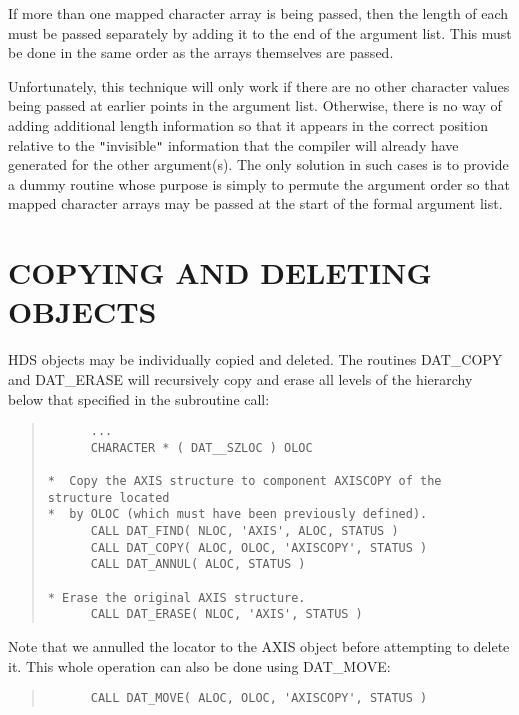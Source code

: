 \documentclass[11pt]{article}
\newcommand{\htmlref}[2]{#1}
\newcommand{\xlabel}[1]{}
\newcommand{\qt}[1]{``#1''}
\renewcommand{\qt}[1]{{\tt{"}}#1{\tt{"}}}
\begin{document}
If more than one mapped character array is being passed, then the
length of each must be passed separately by adding it to the end of
the argument list.  This must be done in the same order as the arrays
themselves are passed.

Unfortunately, this technique will only work if there are no other
character values being passed at earlier points in the argument
list. Otherwise, there is no way of adding additional length
information so that it appears in the correct position relative to the
\qt{invisible} information that the compiler will already have
generated for the other argument(s). The only solution in such cases
is to provide a dummy routine whose purpose is simply to permute the
argument order so that mapped character arrays may be passed at the
start of the formal argument list.

\section{\xlabel{copying}\xlabel{deleting}COPYING AND DELETING OBJECTS}

HDS objects may be individually copied and deleted.  The routines
\htmlref{DAT\_COPY}{DAT_COPY} and \htmlref{DAT\_ERASE}{DAT_ERASE} will
recursively copy and erase all levels of the hierarchy below that
specified in the subroutine call:

\small
\begin{quote}
\begin{verbatim}
      ...
      CHARACTER * ( DAT__SZLOC ) OLOC

*  Copy the AXIS structure to component AXISCOPY of the structure located
*  by OLOC (which must have been previously defined).
      CALL DAT_FIND( NLOC, 'AXIS', ALOC, STATUS )
      CALL DAT_COPY( ALOC, OLOC, 'AXISCOPY', STATUS )
      CALL DAT_ANNUL( ALOC, STATUS )

* Erase the original AXIS structure.
      CALL DAT_ERASE( NLOC, 'AXIS', STATUS )
\end{verbatim}
\end{quote}
\normalsize

Note that we \htmlref{annulled}{sect:annul} the
\htmlref{locator}{sect:locators} to the AXIS object before attempting
to delete it. This whole operation can also be done using
\htmlref{DAT\_MOVE}{DAT_MOVE}:

\small
\begin{quote}
\begin{verbatim}
      CALL DAT_MOVE( ALOC, OLOC, 'AXISCOPY', STATUS )
\end{verbatim}
\end{quote}
\normalsize
\end{document}
